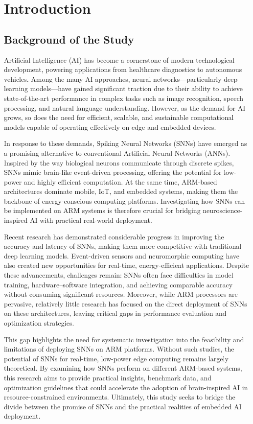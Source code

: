 \section{Introduction}

\subsection{Background of the Study}
Artificial Intelligence (AI) has become a cornerstone of modern technological development, powering applications from healthcare diagnostics to autonomous vehicles. Among the many AI approaches, neural networks—particularly deep learning models—have gained significant traction due to their ability to achieve state-of-the-art performance in complex tasks such as image recognition, speech processing, and natural language understanding. However, as the demand for AI grows, so does the need for efficient, scalable, and sustainable computational models capable of operating effectively on edge and embedded devices.

In response to these demands, Spiking Neural Networks (SNNs) have emerged as a promising alternative to conventional Artificial Neural Networks (ANNs). Inspired by the way biological neurons communicate through discrete spikes, SNNs mimic brain-like event-driven processing, offering the potential for low-power and highly efficient computation. At the same time, ARM-based architectures dominate mobile, IoT, and embedded systems, making them the backbone of energy-conscious computing platforms. Investigating how SNNs can be implemented on ARM systems is therefore crucial for bridging neuroscience-inspired AI with practical real-world deployment.

Recent research has demonstrated considerable progress in improving the accuracy and latency of SNNs, making them more competitive with traditional deep learning models. Event-driven sensors and neuromorphic computing have also created new opportunities for real-time, energy-efficient applications. Despite these advancements, challenges remain: SNNs often face difficulties in model training, hardware–software integration, and achieving comparable accuracy without consuming significant resources. Moreover, while ARM processors are pervasive, relatively little research has focused on the direct deployment of SNNs on these architectures, leaving critical gaps in performance evaluation and optimization strategies.

This gap highlights the need for systematic investigation into the feasibility and limitations of deploying SNNs on ARM platforms. Without such studies, the potential of SNNs for real-time, low-power edge computing remains largely theoretical. By examining how SNNs perform on different ARM-based systems, this research aims to provide practical insights, benchmark data, and optimization guidelines that could accelerate the adoption of brain-inspired AI in resource-constrained environments. Ultimately, this study seeks to bridge the divide between the promise of SNNs and the practical realities of embedded AI deployment.



